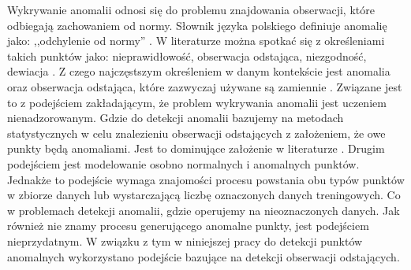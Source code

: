 Wykrywanie anomalii odnosi się do problemu znajdowania obserwacji, które odbiegają zachowaniem od normy. Słownik języka polskiego definiuje anomalię jako: ,,odchylenie od normy'' \cite{pwn}. 
W literaturze można spotkać się z określeniami takich punktów jako: nieprawidłowość, obserwacja odstająca, niezgodność, dewiacja \cite{aggarwal2017outlier}. Z czego najczęstszym określeniem w danym kontekście jest anomalia oraz obserwacja odstająca, które zazwyczaj używane są zamiennie \cite{chandola2009anomaly}. Związane jest to z podejściem zakładającym, że problem wykrywania anomalii jest uczeniem nienadzorowanym. Gdzie do detekcji anomalii bazujemy na metodach statystycznych w celu znalezieniu obserwacji odstających z założeniem, że owe punkty będą anomaliami. Jest to dominujące założenie w literaturze \cite{emmott2015meta}. Drugim podejściem jest modelowanie osobno normalnych i anomalnych punktów. Jednakże to podejście wymaga znajomości procesu powstania obu typów punktów w zbiorze danych lub wystarczającą liczbę oznaczonych danych treningowych. Co w problemach detekcji anomalii, gdzie operujemy na nieoznaczonych danych. Jak również nie znamy procesu generującego anomalne punkty, jest podejściem nieprzydatnym. W związku z tym w niniejszej pracy do detekcji punktów anomalnych wykorzystano podejście bazujące na detekcji obserwacji odstających.
